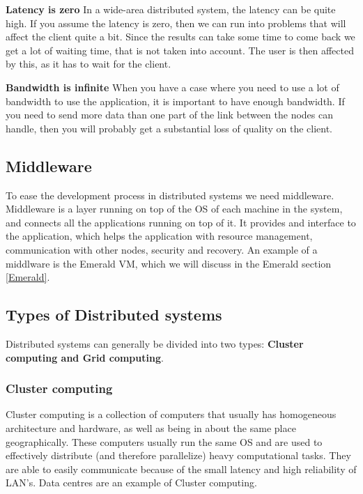 \textbf{Latency is zero}
In a wide-area distributed system, the latency can be quite high. If you assume the latency is zero, then we can run into problems that will affect the client quite a bit. Since the results can take some time to come back we get a lot of waiting time, that is not taken into account. The user is then affected by this, as it has to wait for the client. 

\textbf{Bandwidth is infinite}
When you have a case where you need to use a lot of bandwidth to use the application, it is important to have enough bandwidth. If you need to send more data than one part of the link between the nodes can handle, then you will probably get a substantial loss of quality on the client. 


\subsection{Middleware}
To ease the development process in distributed systems we need middleware. Middleware is a layer running on top of the OS of each machine in the system, and connects all the applications running on top of it. It provides and interface to the application, which helps the application with resource management, communication with other nodes, security and recovery\cite{steen_distributed_2017}. An example of a middlware is the Emerald VM, which we will discuss in the Emerald section \ref{Emerald}. 


\subsection{Types of Distributed systems}
Distributed systems can generally be divided into two types: \textbf{Cluster computing and Grid computing}.

\subsubsection{Cluster computing}
Cluster computing is a collection of computers that usually has homogeneous architecture and hardware, as well as being in about the same place geographically. These computers usually run the same OS and are used to effectively distribute (and therefore parallelize) heavy computational tasks. They are able to easily communicate because of the small latency and high reliability of LAN's. Data centres are an example of Cluster computing. 

